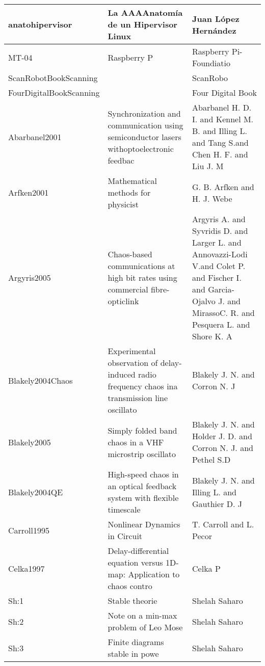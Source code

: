 \documentclass{article}
\begin{document}
\begin{longtable}{|p{}|p{}|p{}|}
\hline
anatohipervisor&La AAAAnatomía de un Hipervisor Linux&Juan López Hernández\\
\hline
MT-04&Raspberry P&Raspberry Pi-Foundiatio\\
\hline
ScanRobotBookScanning&&ScanRobo\\
\hline
FourDigitalBookScanning&&Four Digital Book\\
\hline
Abarbanel2001&Synchronization and communication using semiconductor lasers withoptoelectronic feedbac&Abarbanel H. D. I. and Kennel M. B. and Illing L. and Tang S.and Chen H. F. and Liu J. M\\
\hline
Arfken2001&Mathematical methods for physicist&G. B. Arfken and H. J. Webe\\
\hline
Argyris2005&Chaos-based communications at high bit rates using commercial fibre-opticlink&Argyris A. and Syvridis D. and Larger L. and Annovazzi-Lodi V.and Colet P. and Fischer I. and Garcia-Ojalvo J. and MirassoC. R. and Pesquera L. and Shore K. A\\
\hline
Blakely2004Chaos&Experimental observation of delay-induced radio frequency chaos ina transmission line oscillato&Blakely J. N. and Corron N. J\\
\hline
Blakely2005&Simply folded band chaos in a VHF microstrip oscillato&Blakely J. N. and Holder J. D. and Corron N. J. and Pethel S.D\\
\hline
Blakely2004QE&High-speed chaos in an optical feedback system with flexible timescale&Blakely J. N. and Illing L. and Gauthier D. J\\
\hline
Carroll1995&Nonlinear Dynamics in Circuit&T. Carroll and L. Pecor\\
\hline
Celka1997&Delay-differential equation versus 1D-map: Application to chaos contro&Celka P\\
\hline
Sh:1&Stable theorie&Shelah Saharo\\
\hline
Sh:2&Note on a min-max problem of Leo Mose&Shelah Saharo\\
\hline
Sh:3&Finite diagrams stable in powe&Shelah Saharo\\
\hline
\end{longtable}
\end{document}

